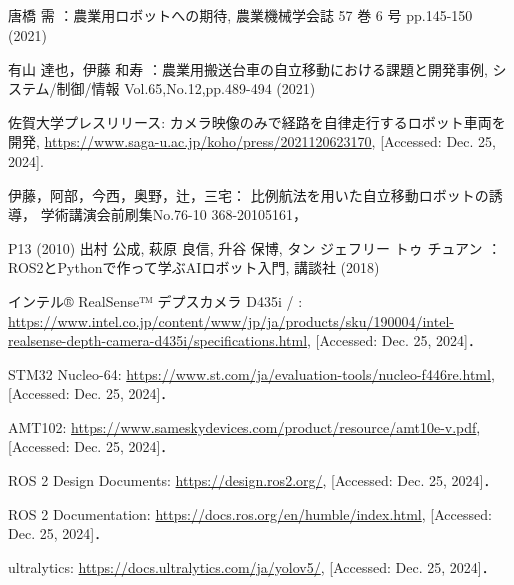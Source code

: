 \begin{center}
	\section*{}                      %
	\vspace*{-2zh}
\end{center}

\begin{thebibliography}{99}
	
	唐橋 需
	：農業用ロボットへの期待, 
	農業機械学会誌  57 巻 6 号 pp.145-150 (2021)
	
	有山 達也，伊藤 和寿
	：農業用搬送台車の自立移動における課題と開発事例, 
	システム/制御/情報 Vol.65,No.12,pp.489-494 (2021)
	
	佐賀大学プレスリリース:
	カメラ映像のみで経路を自律走行するロボット車両を開発, 
	\url{https://www.saga-u.ac.jp/koho/press/2021120623170}, 
	[Accessed: Dec. 25, 2024].
	
	伊藤，阿部，今西，奥野，辻，三宅：
	比例航法を用いた自立移動ロボットの誘導，
	学術講演会前刷集No.76-10 368-20105161，
	
	P13 (2010)
	出村 公成, 萩原 良信, 升谷 保博, タン ジェフリー トゥ チュアン
	：ROS2とPythonで作って学ぶAIロボット入門, 
	講談社 (2018)
	
	インテル® RealSense™ デプスカメラ D435i /
	: \url{https://www.intel.co.jp/content/www/jp/ja/products/sku/190004/intel-realsense-depth-camera-d435i/specifications.html}, [Accessed: Dec. 25, 2024]．
	
	STM32 Nucleo-64: \url{https://www.st.com/ja/evaluation-tools/nucleo-f446re.html}, [Accessed: Dec. 25, 2024]．
	
	AMT102: \url{https://www.sameskydevices.com/product/resource/amt10e-v.pdf}, [Accessed: Dec. 25, 2024]．
	
	ROS 2 Design Documents: \url{https://design.ros2.org/}, [Accessed: Dec. 25, 2024]．
	
	ROS 2 Documentation: \url{https://docs.ros.org/en/humble/index.html}, [Accessed: Dec. 25, 2024]．
	
	ultralytics: \url{https://docs.ultralytics.com/ja/yolov5/}, [Accessed: Dec. 25, 2024]．
	
\end{thebibliography}
